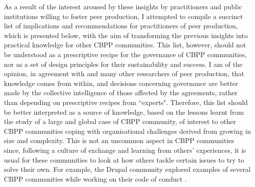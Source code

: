 
As a result of the interest aroused by these insights by practitioners and public institutions willing to foster peer production,
I attempted to compile a succinct list of implications and recommendations for practitioners of peer production, which is presented below, with the aim of transforming the previous insights into practical knowledge for other CBPP communities. This list, however, should not be understood as a prescriptive recipe for the governance of CBPP communities, nor as a set of design principles for their sustainability and success. I am of the opinion, in agreement with \textcite{ostrom1990governing, troxler2014making} and many other researchers of peer production, that knowledge comes from within, and decisions concerning governance are better made by the collective intelligence of those affected by the agreements, rather than depending on prescriptive recipes from ``experts". Therefore, this list should be better interpreted as a source of knowledge, based on the lessons learnt from the study of a large and global case of CBPP community, of interest to other CBPP communities coping with organisational challenges derived from growing in size and complexity. This is not an uncommon aspect in CBPP communities since, following a culture of exchange and learning from others' experiences, it is usual for these communities to look at how others tackle certain issues to try to solve their own. For example, the Drupal community explored examples of several CBPP communities while working on their code of conduct \parencite{DrupalCoC2010}.

